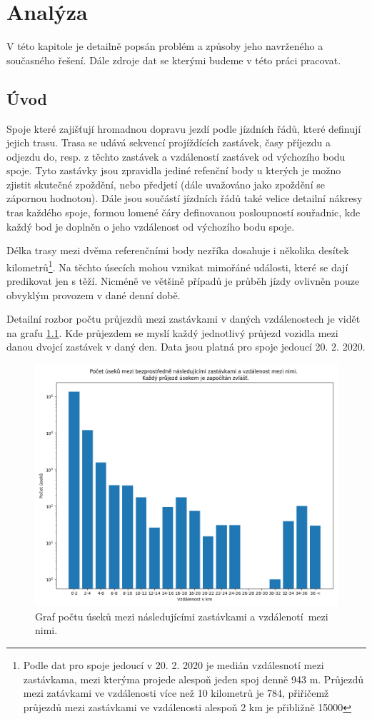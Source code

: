 
\chapter{Analýza}

V této kapitole je detailně popsán problém a způsoby jeho navrženého a současného řešení. Dále zdroje dat se kterými budeme v této práci pracovat.

\section{Úvod}

Spoje které zajišťují hromadnou dopravu jezdí podle jízdních řádů, které definují jejich trasu. Trasa se udává sekvencí projíždících zastávek, časy příjezdu a odjezdu do, resp. z těchto zastávek a vzdáleností zastávek od výchozího bodu spoje. Tyto zastávky jsou zpravidla jediné refenční body u kterých je možno zjistit skutečné zpoždění, nebo předjetí (dále uvažováno jako zpoždění se zápornou hodnotou). Dále jsou součástí jízdních řádů také velice detailní nákresy tras každého spoje, formou lomené čáry definovanou posloupností souřadnic, kde každý bod je doplněn o jeho vzdálenost od výchozího bodu spoje.

\bigbreak

Délka trasy mezi dvěma referenčními body nezříka dosahuje i několika desítek kilometrů\footnote{Podle dat pro spoje jedoucí v 20. 2. 2020 je medián vzdálesnotí mezi zastávkama, mezi kterýma projede alespoň jeden spoj denně 943 m. Průjezdů mezi zatávkami ve vzdálenosti více než 10 kilometrů je 784, přiřičemž průjezdů mezi zastávkami ve vzdálenosti alespoň 2 km je přibližně 15000}. Na těchto úsecích mohou vznikat mimořáné události, které se dají predikovat jen s těží. Nicméně ve většině případů je průběh jízdy ovlivněn pouze obvyklým provozem v dané denní době.

Detailní rozbor počtu průjezdů mezi zastávkami v daných vzdálenostech je vidět na grafu \ref{fig:stop_distances_result}. Kde průjezdem se myslí každý jednotlivý průjezd vozidla mezi danou dvojcí zastávek v daný den. Data jsou platná pro spoje jedoucí 20. 2. 2020.

\begin{figure}
	\centering
  \includegraphics[width=0.6\linewidth]{../img/stop_distances_plot_2020-02-20.png}
  \caption{Graf počtu úseků mezi následujícími zastávkami a vzdálenotí mezi nimi.}
  \label{fig:stop_distances_result}
\end{figure}

